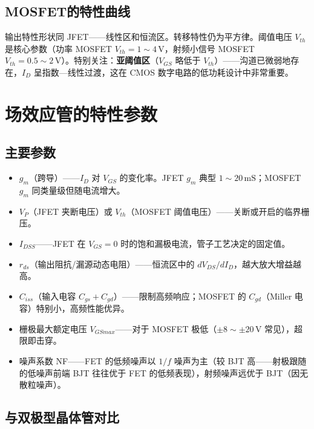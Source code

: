 \documentclass[12pt,UTF8]{ctexbook}
\begin{document}
\subsection{MOSFET的特性曲线}

输出特性形状同 JFET——线性区和恒流区。转移特性仍为平方律。阈值电压 $V_{th}$ 是核心参数（功率 MOSFET $V_{th}=1\sim4\,\mathrm{V}$，射频小信号 MOSFET $V_{th}=0.5\sim2\,\mathrm{V}$）。特别关注：\textbf{亚阈值区}（$V_{GS}$ 略低于 $V_{th}$）——沟道已微弱地存在，$I_D$ 呈指数—线性过渡，这在 CMOS 数字电路的低功耗设计中非常重要。

\section{场效应管的特性参数}
\label{sec:fet_parameters}

\subsection{主要参数}

\begin{itemize}
  \item $g_m$（跨导）——$I_D$ 对 $V_{GS}$ 的变化率。JFET $g_m$ 典型 $1\sim20\,\mathrm{mS}$；MOSFET $g_m$ 同类量级但随电流增大。
  \item $V_P$（JFET 夹断电压）或 $V_{th}$（MOSFET 阈值电压）——关断或开启的临界栅压。
  \item $I_{DSS}$——JFET 在 $V_{GS}=0$ 时的饱和漏极电流，管子工艺决定的固定值。
  \item $r_{ds}$（输出阻抗/漏源动态电阻）——恒流区中的 $d V_{DS}/d I_D$，越大放大增益越高。
  \item $C_{iss}$（输入电容 $C_{gs}+C_{gd}$）——限制高频响应；MOSFET 的 $C_{gd}$（Miller 电容）特别小，高频性能优异。
  \item 栅极最大额定电压 $V_{GS max}$——对于 MOSFET 极低（$\pm8\sim\pm20\,\mathrm{V}$ 常见），超限即击穿。
  \item 噪声系数 NF——FET 的低频噪声以 $1/f$ 噪声为主（较 BJT 高——射极跟随的低噪声前端 BJT 往往优于 FET 的低频表现），射频噪声远优于 BJT（因无散粒噪声）。
\end{itemize}

\subsection{与双极型晶体管对比}
\end{document}
